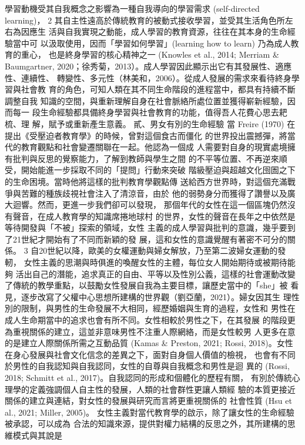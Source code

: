 學習動機受其自我概念之影響為一種自我導向的學習需求 (self-directed learning)，
2 
其自主性遠高於傳統教育的被動式接收學習，並受其生活角色所左右為因應生
活與自我實現之動能，成人學習的教育資源，往往在其本身的生命經驗當中可
以汲取使用，因而「學習如何學習」(learning how to learn) 乃為成人教育的重心，
也是終身學習的核心精神之一 (Knowles et al., 2014; Merriam & Baumgartner, 
2020；徐秀菊，2013）。成人學習因此顯示出它有其發展性、適應性、連續性、
轉變性、多元性（林美和，2006）。從成人發展的需求來看待終身學習與社會教
育的角色，可知人類在其不同生命階段的進程當中，都具有持續不斷調整自我
知識的空間，與重新理解自身在社會脈絡所處位置並獲得嶄新經驗，因而每一
段生命經驗都具備終身學習與社會教育的功能，值得吾人花費心思去耙梳、理
解，賦予或重新產生意義。 
貳、男女有別的生命經驗 
當 Freire (1970) 在提出《受壓迫者教育學》的時候，曾對這個食古而僵化
的世界投出震撼彈，將當代的教育觀點和社會變遷關聯在一起。他認為一個成
人需要對自身的現實處境擁有批判與反思的覺察能力，了解到教師與學生之間
的不平等位置、不再逆來順受，開始能進一步採取不同的「提問」行動來突破
階級壓迫與超越文化囹圄之下的生命困境。當時他將這樣的批判教育學觀點傳
送給西方世界時，對這個充滿戰爭與苦難的種族歧視社會注入了清涼音，由於
他的弱勢身分而獲得了讚譽以及廣大迴響。然而，更進一步我們卻可以發現，
那個年代的女性在這一個區塊仍然沒有聲音，在成人教育學的知識席捲地球村
的世界，女性的聲音在長年之中依然是等待開發與「不被」探索的領域，女性
主義的成人學習與批判的意識，幾乎要到了21世紀才開始有了不同而新穎的發
展，這和女性的意識覺醒有著密不可分的關係。 
3 
自20世紀以降，歐美的女權運動與婦女解放，乃至第二波婦女運動的發軔，
女性主義的思潮與時俱進的喚醒女性的主體，每位女人開始期待或被期待能夠
活出自己的潛能，追求真正的自由、平等以及性別公義，這樣的社會運動改變
了傳統的教學重點，以鼓勵女性發展自我為主要目標，讓歷史當中的「she」被
看見，逐步改寫了父權中心思想所建構的世界觀（劉亞蘭，2021）。婦女因其生
理性別的限制，與男性的生命發展不大相同，經歷婚姻與生育的過程，女性和
男性在成人生命期當中的追求也會有所不同。女性相較於男性之下，在其發展
的階段更為重視關係的建立，這並非意味男性不注重人際網絡，而是女性較男
人更多在意的是建立人際關係所需之互動品質 (Kamas & Preston, 2021; Rossi, 
2018)。女性在身心發展與社會文化信念的差異之下，面對自身個人價值的檢視，
也會有不同於男性的自我認知與自我認同，女性的自尊與自我概念和男性是迴
異的 (Rossi, 2018; Schmitt et al., 2017)。自我認同的形成和個體化的歷程有關，
有別於傳統心理學的定義強調個人自主性的發展，人類的社會群性更讓人類經
驗的本質更接近關係的建立與連結，對女性的發展與研究而言將更重視關係的
社會性質 (Hsu et al., 2021; Miller, 2005)。 
女性主義對當代教育學的啟示，除了讓女性的生命經驗被承認，可以成為
合法的知識來源，提供對權力結構的反思之外，其所建構的思維模式與其說是
